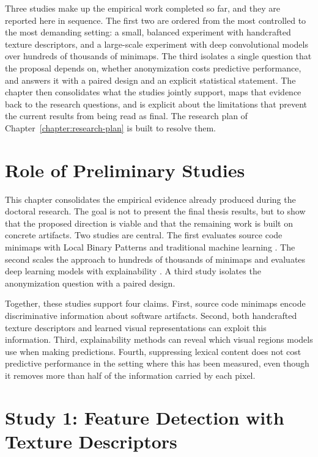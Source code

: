 Three studies make up the empirical work completed so far, and they are
reported here in sequence. The first two are ordered from the most controlled to
the most demanding setting: a small, balanced experiment with handcrafted
texture descriptors, and a large-scale experiment with deep convolutional models
over hundreds of thousands of minimaps. The third isolates a single question
that the proposal depends on, whether anonymization costs predictive
performance, and answers it with a paired design and an explicit statistical
statement. The chapter then consolidates what the studies jointly support, maps
that evidence back to the research questions, and is explicit about the
limitations that prevent the current results from being read as final. The
research plan of Chapter~\ref{chapter:research-plan} is built to resolve them.

\section{Role of Preliminary Studies}

This chapter consolidates the empirical evidence already produced during the
doctoral research. The goal is not to present the final thesis results, but to
show that the proposed direction is viable and that the remaining work is built
on concrete artifacts. Two studies are central. The first evaluates source code
minimaps with Local Binary Patterns and traditional machine learning
\cite{gebara2025iwssip}. The second scales the approach to hundreds of thousands
of minimaps and evaluates deep learning models with explainability
\cite{gebara2025ciarp}. A third study isolates the anonymization question with a
paired design.

Together, these studies support four claims. First, source code minimaps encode
discriminative information about software artifacts. Second, both handcrafted
texture descriptors and learned visual representations can exploit this
information. Third, explainability methods can reveal which visual regions
models use when making predictions. Fourth, suppressing lexical content does not
cost predictive performance in the setting where this has been measured, even
though it removes more than half of the information carried by each pixel.

\section{Study 1: Feature Detection with Texture Descriptors}

